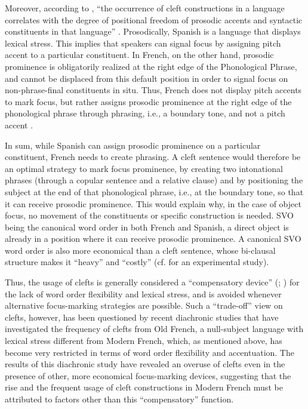 Moreover, according to \textcite{lambrecht2001framework}, ``the occurrence of cleft constructions in a language correlates with the degree of positional freedom of prosodic accents and syntactic constituents in that language” \parencite[488]{lambrecht2001framework}. 
Prosodically, Spanish is a language that displays lexical stress. This implies that speakers can signal focus by assigning pitch accent to a particular constituent. In French, on the other hand, prosodic  prominence   is  obligatorily realized at the right edge of the Phonological Phrase, and cannot be displaced from this default position in order to signal focus on non-phrase-final constituents in situ. Thus, French does not display pitch accents to mark focus, but rather assigns prosodic prominence at the right edge of the phonological phrase through phrasing, i.e., a boundary tone, and not a pitch accent \parencite{fery2001focus}.

In sum, while Spanish can assign prosodic prominence on a particular constituent, French needs to create phrasing. A cleft sentence would therefore be an optimal strategy to mark focus prominence, by creating two intonational phrases (through a copular sentence and a relative clause) and by positioning the subject at the end of that phonological phrase, i.e., at the boundary tone, so that it can receive prosodic prominence. This would explain why, in the case of object focus, no movement of the constituents or specific construction is needed. SVO being the canonical word order in both French and Spanish, a direct object is already in a position where it can receive prosodic prominence. A canonical SVO word order is also more economical than a cleft sentence, whose bi-clausal structure makes it ``heavy” and ``costly” (cf. \cite{destruel2016focus} for an experimental study).

Thus, the usage of clefts is generally considered a “compensatory device” (\cite[457]{doherty2001discourse}; \cite[487]{di2006clefting}) for the lack of word order flexibility and lexical stress, and is avoided  whenever alternative focus-marking strategies are possible. Such a ``trade-off” view on clefts, however, has been questioned by recent diachronic studies \parencite{dufter2008explaining} that have investigated the frequency of clefts from Old French, a null-subject language with lexical stress different from Modern French, which, as mentioned above, has become very restricted in terms of word order flexibility and accentuation. The results of this diachronic study have revealed an overuse of clefts even in the presence of other, more economical focus-marking devices, suggesting that the rise and the frequent usage of cleft constructions in Modern French must be attributed to factors other than this ``compensatory” function.

